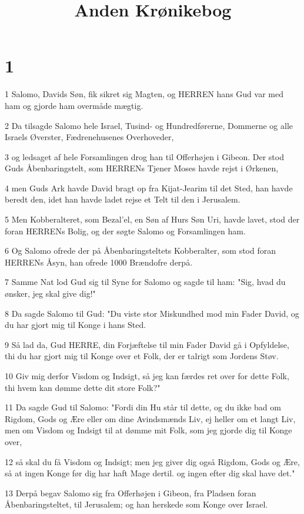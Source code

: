 

\title{Anden Krønikebog}


\chapter{1}

\par 1 Salomo, Davids Søn, fik sikret sig Magten, og HERREN hans Gud var med ham og gjorde ham overmåde mægtig.
\par 2 Da tilsagde Salomo hele Israel, Tusind- og Hundredførerne, Dommerne og alle Israels Øverster, Fædrenehusenes Overhoveder,
\par 3 og ledsaget af hele Forsamlingen drog han til Offerhøjen i Gibeon. Der stod Guds Åbenbaringstelt, som HERRENs Tjener Moses havde rejst i Ørkenen,
\par 4 men Guds Ark havde David bragt op fra Kijat-Jearim til det Sted, han havde beredt den, idet han havde ladet rejse et Telt til den i Jerusalem.
\par 5 Men Kobberalteret, som Bezal'el, en Søn af Hurs Søn Uri, havde lavet, stod der foran HERRENs Bolig, og der søgte Salomo og Forsamlingen ham.
\par 6 Og Salomo ofrede der på Åbenbaringsteltets Kobberalter, som stod foran HERRENs Åsyn, han ofrede 1000 Brændofre derpå.
\par 7 Samme Nat lod Gud sig til Syne for Salomo og sagde til ham: "Sig, hvad du ønsker, jeg skal give dig!"
\par 8 Da sagde Salomo til Gud: "Du viste stor Miskundhed mod min Fader David, og du har gjort mig til Konge i hans Sted.
\par 9 Så lad da, Gud HERRE, din Forjæftelse til min Fader David gå i Opfyldelse, thi du har gjort mig til Konge over et Folk, der er talrigt som Jordens Støv.
\par 10 Giv mig derfor Visdom og Indsigt, så jeg kan færdes ret over for dette Folk, thi hvem kan dømme dette dit store Folk?"
\par 11 Da sagde Gud til Salomo: "Fordi din Hu står til dette, og du ikke bad om Rigdom, Gods og Ære eller om dine Avindsmænds Liv, ej heller om et langt Liv, men om Visdom og Indsigt til at dømme mit Folk, som jeg gjorde dig til Konge over,
\par 12 så skal du få Visdom og Indsigt; men jeg giver dig også Rigdom, Gods og Ære, så at ingen Konge før dig har haft Mage dertil. og ingen efter dig skal have det."
\par 13 Derpå begav Salomo sig fra Offerhøjen i Gibeon, fra Pladsen foran Åbenbaringsteltet, til Jerusalem; og han herskede som Konge over Israel.
